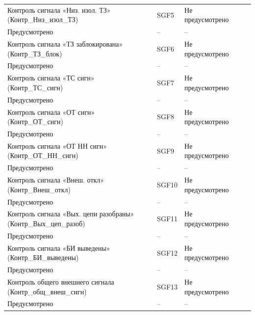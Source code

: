 \begin{longtable}{|>{\centering\arraybackslash}m{5.3cm}|>{\centering\arraybackslash}m{3.3cm}|>{\centering\arraybackslash}m{4.2cm}|>{\centering\arraybackslash}m{1.8cm}|>{\centering\arraybackslash}m{1cm}|}
\hline
\centering Контроль сигнала «Низ. изол. ТЗ» (Контр\_Низ\_изол\_ТЗ)  & \centering SGF5 & \centering Не предусмотрено \\ Предусмотрено & \centering -- & \centering \arraybackslash -- \\
\hline
\centering Контроль сигнала «ТЗ заблокирована» (Контр\_ТЗ\_блок)  & \centering SGF6 & \centering Не предусмотрено \\ Предусмотрено & \centering -- & \centering \arraybackslash -- \\
\hline
\centering Контроль сигнала «ТС сигн» (Контр\_ТС\_сигн)  & \centering SGF7 & \centering Не предусмотрено \\ Предусмотрено & \centering -- & \centering \arraybackslash -- \\
\hline
\centering Контроль сигнала «ОТ сигн» (Контр\_ОТ\_сигн)  & \centering SGF8 & \centering Не предусмотрено \\ Предусмотрено & \centering -- & \centering \arraybackslash -- \\
\hline
\centering Контроль сигнала «ОТ НН сигн» (Контр\_ОТ\_НН\_сигн)  & \centering SGF9 & \centering Не предусмотрено \\ Предусмотрено & \centering -- & \centering \arraybackslash -- \\
\hline
\centering Контроль сигнала «Внеш. откл» (Контр\_Внеш\_откл)  & \centering SGF10 & \centering Не предусмотрено \\ Предусмотрено & \centering -- & \centering \arraybackslash -- \\
\hline
\centering Контроль сигнала «Вых. цепи разобраны» (Контр\_Вых\_цеп\_разоб)  & \centering SGF11 & \centering Не предусмотрено \\ Предусмотрено & \centering -- & \centering \arraybackslash -- \\
\hline
\centering Контроль сигнала «БИ выведены» (Контр\_БИ\_выведены)  & \centering SGF12 & \centering Не предусмотрено \\ Предусмотрено & \centering -- & \centering \arraybackslash -- \\
\hline
\centering Контроль общего внешнего сигнала (Контр\_общ\_внеш\_сигн)  & \centering SGF13 & \centering Не предусмотрено \\ Предусмотрено & \centering -- & \centering \arraybackslash -- \\
\hline
\end{longtable}
\normalsize



